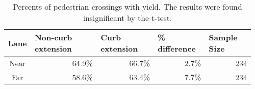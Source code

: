 \begin{table}[!htbp]
\centering
\begin{tabular}{@{}crrrr@{}}
\toprule
\multicolumn{1}{l}{Lane} & \multicolumn{1}{l}{Non-curb extension} & \multicolumn{1}{l}{Curb extension} & \multicolumn{1}{l}{\% difference} & \multicolumn{1}{l}{Sample Size} \\ \midrule
Near                     & 64.9\%                                 & 66.7\%                             & 2.7\%                             & 234                             \\
Far                      & 58.6\%                                 & 63.4\%                             & 7.7\%                             & 234                            \\
\bottomrule
\end{tabular}
\caption[Percents of pedestrian crossings with yield]{Percents of pedestrian crossings with yield. The results were found insignificant by the t-test.}\label{table:motorist-yielded}
\end{table}